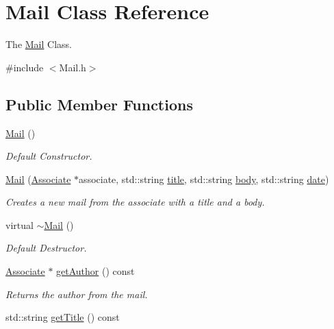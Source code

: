 \hypertarget{classMail}{}\section{Mail Class Reference}
\label{classMail}


The \mbox{\hyperlink{classMail}{Mail}} Class.  




{\ttfamily \#include $<$Mail.\+h$>$}

\subsection*{Public Member Functions}
\begin{DoxyCompactItemize}
\item 
\mbox{\hyperlink{classMail_acd3d916cd6a769cdaf6e91dbc2c85699}{Mail}} ()
\begin{DoxyCompactList}\small\item\em Default Constructor. \end{DoxyCompactList}\item 
\mbox{\hyperlink{classMail_a5801c10c9e03a2ea2f0def9f5a957e18}{Mail}} (\mbox{\hyperlink{classAssociate}{Associate}} $\ast$associate, std\+::string \mbox{\hyperlink{classMail_a2f54f71a529dec6345d84ae60562b207}{title}}, std\+::string \mbox{\hyperlink{classMail_aaa91a94ee92b2712218a9cae389554f7}{body}}, std\+::string \mbox{\hyperlink{classMail_aee9bc87682f6173b92bf135397f38162}{date}})
\begin{DoxyCompactList}\small\item\em Creates a new mail from the associate with a title and a body. \end{DoxyCompactList}\item 
virtual \mbox{\hyperlink{classMail_a7f59d642ff71033500e1fac06ce9b3b1}{$\sim$\+Mail}} ()
\begin{DoxyCompactList}\small\item\em Default Destructor. \end{DoxyCompactList}\item 
\mbox{\hyperlink{classAssociate}{Associate}} $\ast$ \mbox{\hyperlink{classMail_a23db9880d8a7d0fed31668b895fc3899}{get\+Author}} () const
\begin{DoxyCompactList}\small\item\em Returns the author from the mail. \end{DoxyCompactList}\item 
std\+::string \mbox{\hyperlink{classMail_aa51a6657dd3e594e8638ac4486660675}{get\+Title}} () const

\end{DoxyCompactItemize}
